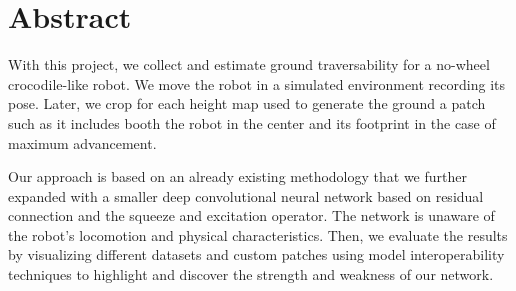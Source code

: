 \documentclass[../document.tex]{subfiles}
\begin{document}
\section{Abstract}
With this project, we collect and estimate ground traversability for a no-wheel crocodile-like robot. We move the robot in a simulated environment recording its pose. Later, we crop for each height map used to generate the ground a patch such as it includes 
booth the robot in the center and its footprint in the case of maximum advancement.

Our approach is based on 
an already existing methodology that we further expanded with a smaller deep convolutional neural network based on residual connection and the squeeze and excitation operator.
The network is unaware of the robot's locomotion and physical characteristics. 
Then, we evaluate the results by visualizing different datasets and custom patches using model interoperability techniques to highlight and discover the strength and weakness of our network.
\end{document}
